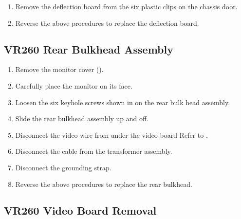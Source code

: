 \begin{enumerate}

\item	Remove the deflection board from the six plastic clips on the chassis door.

\item	Reverse the above procedures to replace the deflection board.
\end{enumerate}
\newpage

\subsection{VR260 Rear Bulkhead Assembly}

\begin{enumerate}

\item	Remove the monitor cover ().

\item	Carefully place the monitor on its face.

\item	Loosen the six keyhole screws shown in  on the rear bulk
		head assembly.


\item	Slide the rear bulkhead assembly up and off.
\newpage
\item	 Disconnect the video wire from under the video board Refer to .
 
\item	Disconnect the cable from the transformer assembly.

\item	Disconnect the grounding strap.


\item	Reverse the above procedures to replace the rear bulkhead.
\end{enumerate}
\newpage

\subsection{VR260 Video Board Removal}

